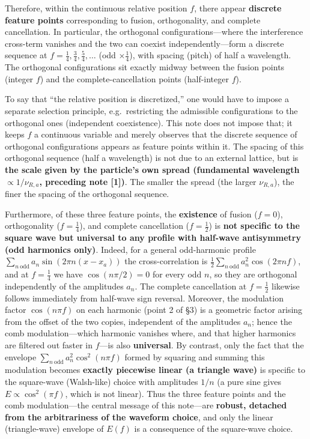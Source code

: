 \documentclass[
]{article}
\begin{document}
Therefore, within the continuous relative position \(f\), there appear
\textbf{discrete feature points} corresponding to fusion, orthogonality,
and complete cancellation. In particular, the orthogonal
configurations---where the interference cross-term vanishes and the two
can coexist independently---form a discrete sequence at
\(f=\tfrac14,\tfrac34,\tfrac54,\dots\) (odd \(\times\tfrac14\)), with
spacing (pitch) of half a wavelength. The orthogonal configurations sit
exactly midway between the fusion points (integer \(f\)) and the
complete-cancellation points (half-integer \(f\)).

To say that ``the relative position is discretized,'' one would have to
impose a separate selection principle, e.g.~restricting the admissible
configurations to the orthogonal ones (independent coexistence). This
note does not impose that; it keeps \(f\) a continuous variable and
merely observes that the discrete sequence of orthogonal configurations
appears as feature points within it. The spacing of this orthogonal
sequence (half a wavelength) is not due to an external lattice, but is
\textbf{the scale given by the particle's own spread (fundamental
wavelength \(\propto1/\nu_{R,a}\), preceding note {[}1{]})}. The smaller
the spread (the larger \(\nu_{R,a}\)), the finer the spacing of the
orthogonal sequence.

Furthermore, of these three feature points, the \textbf{existence} of
fusion (\(f=0\)), orthogonality (\(f=\tfrac14\)), and complete
cancellation (\(f=\tfrac12\)) is \textbf{not specific to the square wave
but universal to any profile with half-wave antisymmetry (odd harmonics
only)}. Indeed, for a general odd-harmonic profile
\(\sum_{n\ \mathrm{odd}}a_n\sin(2\pi n(x-x_a))\) the cross-correlation
is \(\tfrac12\sum_{n\ \mathrm{odd}}a_n^2\cos(2\pi n f)\), and at
\(f=\tfrac14\) we have \(\cos(n\pi/2)=0\) for every odd \(n\), so they
are orthogonal independently of the amplitudes \(a_n\). The complete
cancellation at \(f=\tfrac12\) likewise follows immediately from
half-wave sign reversal. Moreover, the modulation factor
\(\cos(n\pi f)\) on each harmonic (point 2 of §3) is a geometric factor
arising from the offset of the two copies, independent of the amplitudes
\(a_n\); hence the comb modulation---which harmonic vanishes where, and
that higher harmonics are filtered out faster in \(f\)---is also
\textbf{universal}. By contrast, only the fact that the envelope
\(\sum_{n\ \mathrm{odd}}a_n^2\cos^2(n\pi f)\) formed by squaring and
summing this modulation becomes \textbf{exactly piecewise linear (a
triangle wave)} is specific to the square-wave (Walsh-like) choice with
amplitudes \(1/n\) (a pure sine gives \(E\propto\cos^2(\pi f)\), which
is not linear). Thus the three feature points and the comb
modulation---the central message of this note---are \textbf{robust,
detached from the arbitrariness of the waveform choice}, and only the
linear (triangle-wave) envelope of \(E(f)\) is a consequence of the
square-wave choice.
\end{document}
